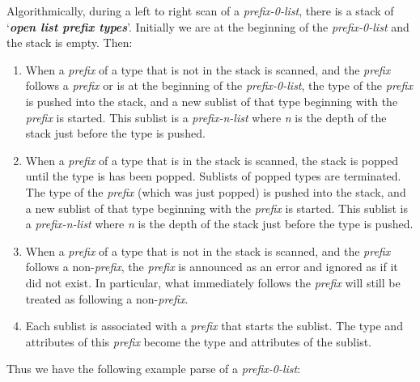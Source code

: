 \documentclass[12pt]{article}
\newcommand{\key}[1]{{\bf \em #1}\index{#1}}
\begin{document}
Algorithmically, during a left to right scan of a {\em prefix-0-list},
there is a stack of `\key{open list prefix types}'.  Initially we are
at the beginning of the {\em prefix-0-list} and the stack is empty.
Then:
\begin{enumerate}

\item
When a {\em prefix} of a type that is not in the stack is scanned,
and the {\em prefix} follows a {\em prefix} or is at the
beginning of the {\em prefix-0-list},
the type of the {\em prefix} is pushed into the stack, and a new sublist
of that type beginning with the {\em prefix} is started.
This sublist is a {\em prefix-n-list} where {\em n} is the depth of
the stack just before the type is pushed.

\item
When a {\em prefix} of a type that is in the stack is scanned, the
stack is popped
until the type is has been popped.  Sublists of popped types
are terminated.
The type of the {\em prefix} (which was just popped)
is pushed into the stack, and a new sublist
of that type beginning with the {\em prefix} is started.
This sublist is a {\em prefix-n-list} where {\em n} is the depth of
the stack just before the type is pushed.

\item
When a {\em prefix} of a type that is not in the stack is scanned,
and the {\em prefix} follows a non-{\em prefix},
the {\em prefix} is announced as an error and ignored as if it
did not exist.  In particular, what immediately follows the {\em prefix}
will still be treated as following a non-{\em prefix}.

\item
Each sublist is associated with a {\em prefix} that starts the
sublist.  The type and attributes of this {\em prefix} become the
type and attributes of the sublist.

\end{enumerate}


Thus we have the following example parse of a {\em prefix-0-list}:
\end{document}
